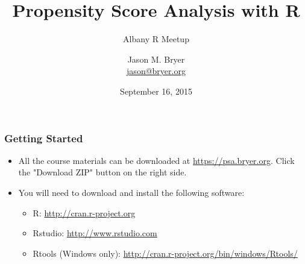 \documentclass[10pt,slidestop,mathserif,c]{beamer}
\title{Propensity Score Analysis with R}
\subtitle{Albany R Meetup}
\author[Bryer]{Jason M. Bryer\\\href{mailto:jason@bryer.org}{jason@bryer.org}}
\institute[Excelsior]{Excelsior College\\
      Albany, NY 12203 \\
      \url{http://github.com/jbryer/psa}}
\date[Sept 16, 2015]{September 16, 2015}
\begin{document}




\begin{frame}[plain]
  \titlepage
\end{frame}

\begin{frame}
    \frametitle{Getting Started}
    \begin{itemize}
        \item All the course materials can be downloaded at \url{https://psa.bryer.org}. Click the "Download ZIP" button on the right side.
        \item You will need to download and install the following software:
        \begin{itemize}
            \item R: \url{http://cran.r-project.org}
            \item Rstudio: \url{http://www.rstudio.com}
            \item Rtools (Windows only): \url{http://cran.r-project.org/bin/windows/Rtools/}
        \end{itemize}

    \end{itemize}
        
\end{frame}



\end{document}
